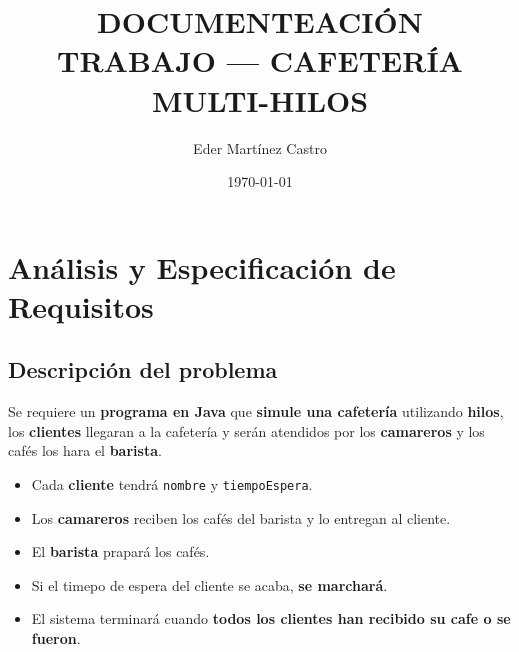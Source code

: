 \documentclass[a4paper,12pt]{report}
\title{DOCUMENTEACIÓN\\\LARGE TRABAJO — CAFETERÍA MULTI-HILOS}
\author{Eder Martínez Castro}
\date{\today}
\begin{document}
\maketitle
\tableofcontents
\clearpage

\section{Análisis y Especificación de Requisitos}
\subsection{Descripción del problema}
\noindent Se requiere un \textbf{programa en Java} que \textbf{simule una cafetería} utilizando \textbf{hilos}, los \textbf{clientes} llegaran a la cafetería y serán atendidos por los \textbf{camareros} y los cafés los hara el \textbf{barista}.
\begin{itemize}
    \item Cada \textbf{cliente} tendrá \texttt{nombre} y \texttt{tiempoEspera}.
    \item Los \textbf{camareros} reciben los cafés del barista y lo entregan al cliente.
    \item El \textbf{barista} prapará los cafés.
    \item Si el timepo de espera del cliente se acaba, \textbf{se marchará}.
    \item El sistema terminará cuando \textbf{todos los clientes han recibido su cafe o se fueron}.
\end{itemize}
\end{document}
